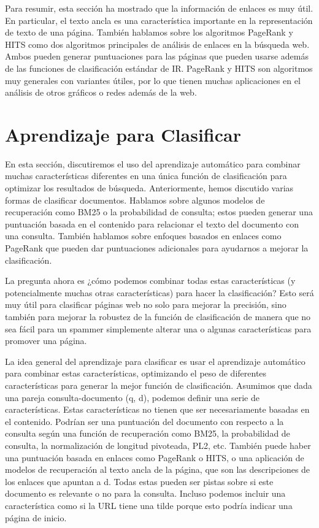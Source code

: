 Para resumir, esta sección ha mostrado que la información de enlaces es muy útil. En particular, el texto ancla es una característica importante en la representación de texto de una página. También hablamos sobre los algoritmos PageRank y HITS como dos algoritmos principales de análisis de enlaces en la búsqueda web. Ambos pueden generar puntuaciones para las páginas que pueden usarse además de las funciones de clasificación estándar de IR. PageRank y HITS son algoritmos muy generales con variantes útiles, por lo que tienen muchas aplicaciones en el análisis de otros gráficos o redes además de la web.

\section{Aprendizaje para Clasificar}

En esta sección, discutiremos el uso del aprendizaje automático para combinar muchas características diferentes en una única función de clasificación para optimizar los resultados de búsqueda. Anteriormente, hemos discutido varias formas de clasificar documentos. Hablamos sobre algunos modelos de recuperación como BM25 o la probabilidad de consulta; estos pueden generar una puntuación basada en el contenido para relacionar el texto del documento con una consulta. También hablamos sobre enfoques basados en enlaces como PageRank que pueden dar puntuaciones adicionales para ayudarnos a mejorar la clasificación.

La pregunta ahora es ¿cómo podemos combinar todas estas características (y potencialmente muchas otras características) para hacer la clasificación? Esto será muy útil para clasificar páginas web no solo para mejorar la precisión, sino también para mejorar la robustez de la función de clasificación de manera que no sea fácil para un spammer simplemente alterar una o algunas características para promover una página.

La idea general del aprendizaje para clasificar es usar el aprendizaje automático para combinar estas características, optimizando el peso de diferentes características para generar la mejor función de clasificación. Asumimos que dada una pareja consulta-documento (q, d), podemos definir una serie de características. Estas características no tienen que ser necesariamente basadas en el contenido. Podrían ser una puntuación del documento con respecto a la consulta según una función de recuperación como BM25, la probabilidad de consulta, la normalización de longitud pivoteada, PL2, etc. También puede haber una puntuación basada en enlaces como PageRank o HITS, o una aplicación de modelos de recuperación al texto ancla de la página, que son las descripciones de los enlaces que apuntan a d. Todas estas pueden ser pistas sobre si este documento es relevante o no para la consulta. Incluso podemos incluir una característica como si la URL tiene una tilde porque esto podría indicar una página de inicio.

